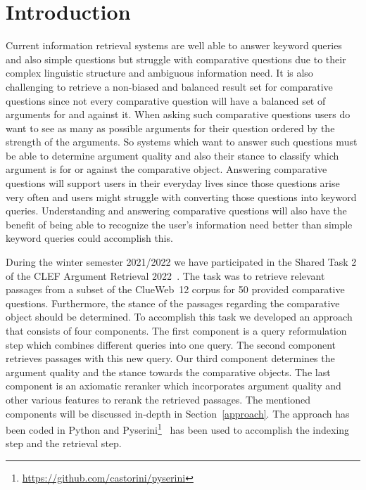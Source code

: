 \section{Introduction}\label{intro}

Current information retrieval systems are well able to answer keyword queries and also simple questions but struggle with comparative questions due to their complex linguistic structure and ambiguous information need.
It is also challenging to retrieve a non-biased and balanced result set for comparative questions since not every comparative question will have a balanced set of arguments for and against it.
When asking such comparative questions users do want to see as many as possible arguments for their question ordered by the strength of the arguments.
So systems which want to answer such questions must be able to determine argument quality and also their stance to classify which argument is for or against the comparative object.
Answering comparative questions will support users in their everyday lives since those questions arise very often and users might struggle with converting those questions into keyword queries.
Understanding and answering comparative questions will also have the benefit of being able to recognize the user's information need better than simple keyword queries could accomplish this. 

During the winter semester 2021/2022 we have participated in the Shared Task 2 of the CLEF Argument Retrieval 2022~\cite{BondarenkoFKSGBPBSWPH2022}.
The task was to retrieve relevant passages from a subset of the ClueWeb~12 corpus for 50 provided comparative questions. Furthermore, the stance of the passages regarding the comparative object should be determined.
To accomplish this task we developed an approach that consists of four components.
The first component is a query reformulation step which combines different queries into one query.
The second component retrieves passages with this new query.
Our third component determines the argument quality and the stance towards the comparative objects.
The last component is an axiomatic reranker which incorporates argument quality and other various features to rerank the retrieved passages.
The mentioned components will be discussed in-depth in Section~\ref{approach}. The approach has been coded in Python and Pyserini\footnote{\url{https://github.com/castorini/pyserini}}~\cite{LinMLYPN2021} has been used to accomplish the indexing step and the retrieval step.
